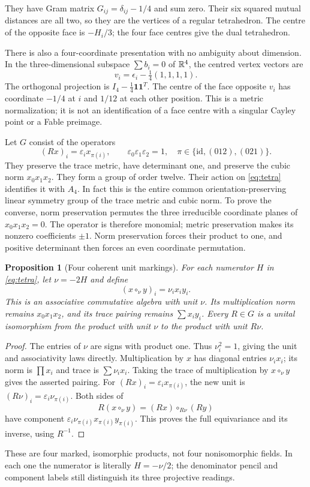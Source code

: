 \documentclass[11pt]{article}
\newtheorem{proposition}[theorem]{Proposition}
\theoremstyle{remark}\newtheorem{remark}[theorem]{Remark}
\begin{document}
They have Gram matrix $G_{ij}=\delta_{ij}-1/4$ and sum zero. Their six squared mutual distances are all two, so they are the vertices of a regular tetrahedron. The centre of the opposite face is $-H_i/3$; the four face centres give the dual tetrahedron.

There is also a four-coordinate presentation with no ambiguity about dimension. In the three-dimensional subspace $\sum b_i=0$ of $\mathbb R^4$, the centred vertex vectors are
\[
 v_i=\epsilon_i-\tfrac14(1,1,1,1).
\]
The orthogonal projection is $I_4-\frac14\mathbf1\mathbf1^T$. The centre of the face opposite $v_i$ has coordinate $-1/4$ at $i$ and $1/12$ at each other position. This is a metric normalization; it is not an identification of a face centre with a singular Cayley point or a Fable preimage.

Let $G$ consist of the operators
\[
 (Rx)_i=\varepsilon_i x_{\pi(i)},\qquad
 \varepsilon_0\varepsilon_1\varepsilon_2=1,
 \quad \pi\in\{\mathrm{id},(012),(021)\}.
\]
They preserve the trace metric, have determinant one, and preserve the cubic norm $x_0x_1x_2$. They form a group of order twelve. Their action on \eqref{eq:tetra} identifies it with $A_4$. In fact this is the entire common orientation-preserving linear symmetry group of the trace metric and cubic norm. To prove the converse, norm preservation permutes the three irreducible coordinate planes of $x_0x_1x_2=0$. The operator is therefore monomial; metric preservation makes its nonzero coefficients $\pm1$. Norm preservation forces their product to one, and positive determinant then forces an even coordinate permutation.

\begin{proposition}[Four coherent unit markings]
For each numerator $H$ in \eqref{eq:tetra}, let $\nu=-2H$ and define
\[
 (x\circ_\nu y)_i=\nu_i x_i y_i.
\]
This is an associative commutative algebra with unit $\nu$. Its multiplication norm remains $x_0x_1x_2$, and its trace pairing remains $\sum x_i y_i$. Every $R\in G$ is a unital isomorphism from the product with unit $\nu$ to the product with unit $R\nu$.
\end{proposition}
\begin{proof}
The entries of $\nu$ are signs with product one. Thus $\nu_i^2=1$, giving the unit and associativity laws directly. Multiplication by $x$ has diagonal entries $\nu_ix_i$; its norm is $\prod x_i$ and trace is $\sum\nu_ix_i$. Taking the trace of multiplication by $x\circ_\nu y$ gives the asserted pairing. For $(Rx)_i=\varepsilon_ix_{\pi(i)}$, the new unit is $(R\nu)_i=\varepsilon_i\nu_{\pi(i)}$. Both sides of
\[
 R(x\circ_\nu y)=(Rx)\circ_{R\nu}(Ry)
\]
have component $\varepsilon_i\nu_{\pi(i)}x_{\pi(i)}y_{\pi(i)}$. This proves the full equivariance and its inverse, using $R^{-1}$.
\end{proof}
These are four marked, isomorphic products, not four nonisomorphic fields. In each one the numerator is literally $H=-\nu/2$; the denominator pencil and component labels still distinguish its three projective readings.
\end{document}
